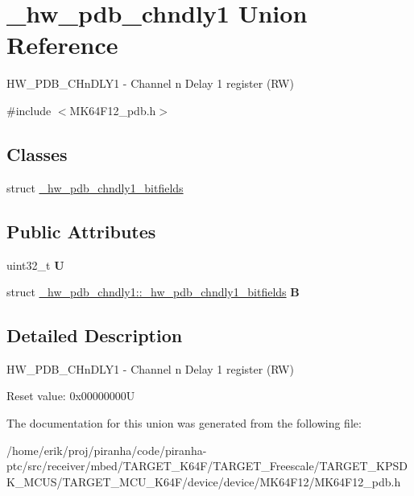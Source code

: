 \hypertarget{union__hw__pdb__chndly1}{}\section{\+\_\+hw\+\_\+pdb\+\_\+chndly1 Union Reference}
\label{union__hw__pdb__chndly1}


H\+W\+\_\+\+P\+D\+B\+\_\+\+C\+Hn\+D\+L\+Y1 -\/ Channel n Delay 1 register (RW)  




{\ttfamily \#include $<$M\+K64\+F12\+\_\+pdb.\+h$>$}

\subsection*{Classes}
\begin{DoxyCompactItemize}
\item 
struct \hyperlink{struct__hw__pdb__chndly1_1_1__hw__pdb__chndly1__bitfields}{\+\_\+hw\+\_\+pdb\+\_\+chndly1\+\_\+bitfields}
\end{DoxyCompactItemize}
\subsection*{Public Attributes}
\begin{DoxyCompactItemize}
\item 
uint32\+\_\+t {\bfseries U}\hypertarget{union__hw__pdb__chndly1_acb3d99133ed6f6074e45be30fa2d9832}{}\label{union__hw__pdb__chndly1_acb3d99133ed6f6074e45be30fa2d9832}

\item 
struct \hyperlink{struct__hw__pdb__chndly1_1_1__hw__pdb__chndly1__bitfields}{\+\_\+hw\+\_\+pdb\+\_\+chndly1\+::\+\_\+hw\+\_\+pdb\+\_\+chndly1\+\_\+bitfields} {\bfseries B}\hypertarget{union__hw__pdb__chndly1_a286dbc5433c42af3fc1f350a8de7ec37}{}\label{union__hw__pdb__chndly1_a286dbc5433c42af3fc1f350a8de7ec37}

\end{DoxyCompactItemize}


\subsection{Detailed Description}
H\+W\+\_\+\+P\+D\+B\+\_\+\+C\+Hn\+D\+L\+Y1 -\/ Channel n Delay 1 register (RW) 

Reset value\+: 0x00000000U 

The documentation for this union was generated from the following file\+:\begin{DoxyCompactItemize}
\item 
/home/erik/proj/piranha/code/piranha-\/ptc/src/receiver/mbed/\+T\+A\+R\+G\+E\+T\+\_\+\+K64\+F/\+T\+A\+R\+G\+E\+T\+\_\+\+Freescale/\+T\+A\+R\+G\+E\+T\+\_\+\+K\+P\+S\+D\+K\+\_\+\+M\+C\+U\+S/\+T\+A\+R\+G\+E\+T\+\_\+\+M\+C\+U\+\_\+\+K64\+F/device/device/\+M\+K64\+F12/M\+K64\+F12\+\_\+pdb.\+h\end{DoxyCompactItemize}
